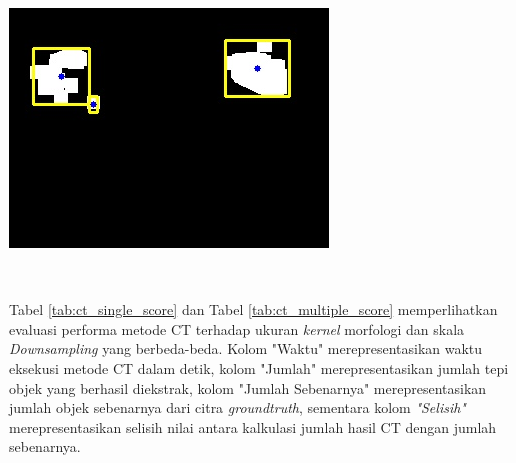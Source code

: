 \begin{longtblr}
\begin{minipage}{0.3\textwidth}
                \includegraphics[width=\linewidth]{image/gt_116/gt_116_contour_downsample_x8_m7x13_frame859.jpg}
            \end{minipage} \\ 
            \hline
        \end{longtblr}
    
    	Tabel \ref{tab:ct_single_score} dan Tabel \ref{tab:ct_multiple_score} memperlihatkan evaluasi performa metode CT terhadap ukuran \textit{kernel} morfologi dan skala \textit{Downsampling} yang berbeda-beda. Kolom "Waktu" merepresentasikan waktu eksekusi metode CT dalam detik, kolom "Jumlah" merepresentasikan jumlah tepi objek yang berhasil diekstrak, kolom "Jumlah Sebenarnya" merepresentasikan jumlah objek sebenarnya dari citra \textit{groundtruth}, sementara kolom \textit{"Selisih"} merepresentasikan selisih nilai antara kalkulasi jumlah hasil CT dengan jumlah sebenarnya.
    
